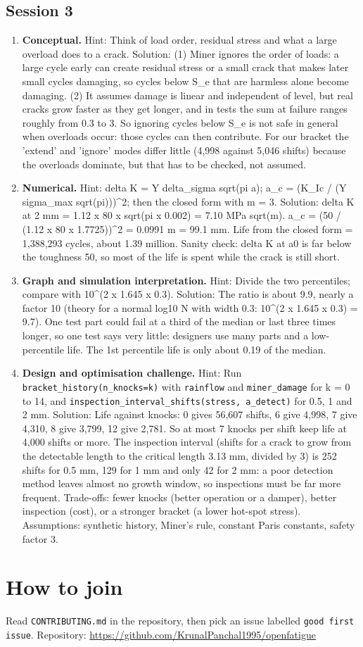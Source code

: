 \documentclass[11pt,a4paper]{article}
\begin{document}
\subsection*{Session 3}
\begin{enumerate}[nosep]
\item \textbf{Conceptual.} Hint: Think of load order, residual stress and what a large overload does to a crack. Solution: (1) Miner ignores the order of loads: a large cycle early can create residual stress or a small crack that makes later small cycles damaging, so cycles below S\_e that are harmless alone become damaging. (2) It assumes damage is linear and independent of level, but real cracks grow faster as they get longer, and in tests the sum at failure ranges roughly from 0.3 to 3. So ignoring cycles below S\_e is not safe in general when overloads occur: those cycles can then contribute. For our bracket the 'extend' and 'ignore' modes differ little (4,998 against 5,046 shifts) because the overloads dominate, but that has to be checked, not assumed.
\item \textbf{Numerical.} Hint: delta K = Y delta\_sigma sqrt(pi a); a\_c = (K\_Ic / (Y sigma\_max sqrt(pi)))\textasciicircum{}2; then the closed form with m = 3. Solution: delta K at 2 mm = 1.12 x 80 x sqrt(pi x 0.002) = 7.10 MPa sqrt(m). a\_c = (50 / (1.12 x 80 x 1.7725))\textasciicircum{}2 = 0.0991 m = 99.1 mm. Life from the closed form = 1,388,293 cycles, about 1.39 million. Sanity check: delta K at a0 is far below the toughness 50, so most of the life is spent while the crack is still short.
\item \textbf{Graph and simulation interpretation.} Hint: Divide the two percentiles; compare with 10\textasciicircum{}(2 x 1.645 x 0.3). Solution: The ratio is about 9.9, nearly a factor 10 (theory for a normal log10 N with width 0.3: 10\textasciicircum{}(2 x 1.645 x 0.3) = 9.7). One test part could fail at a third of the median or last three times longer, so one test says very little: designers use many parts and a low-percentile life. The 1st percentile life is only about 0.19 of the median.
\item \textbf{Design and optimisation challenge.} Hint: Run \texttt{bracket\_history(n\_knocks=k)} with \texttt{rainflow} and \texttt{miner\_damage} for k = 0 to 14, and \texttt{inspection\_interval\_shifts(stress, a\_detect)} for 0.5, 1 and 2 mm. Solution: Life against knocks: 0 gives 56,607 shifts, 6 give 4,998, 7 give 4,310, 8 give 3,799, 12 give 2,781. So at most 7 knocks per shift keep life at 4,000 shifts or more. The inspection interval (shifts for a crack to grow from the detectable length to the critical length 3.13 mm, divided by 3) is 252 shifts for 0.5 mm, 129 for 1 mm and only 42 for 2 mm: a poor detection method leaves almost no growth window, so inspections must be far more frequent. Trade-offs: fewer knocks (better operation or a damper), better inspection (cost), or a stronger bracket (a lower hot-spot stress). Assumptions: synthetic history, Miner's rule, constant Paris constants, safety factor 3.
\end{enumerate}

\section{How to join}
Read \texttt{CONTRIBUTING.md} in the repository, then pick an issue labelled \texttt{good first issue}. Repository: \url{https://github.com/KrunalPanchal1995/openfatigue}
\end{document}

